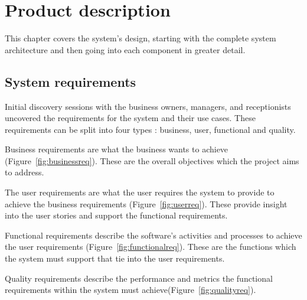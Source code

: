 \chapter{Product description} %
\label{Chapter4} %
This chapter covers the system's design, starting with the complete system architecture and then going into each component in greater detail.



\section{System requirements}
Initial discovery sessions with the business owners, managers, and receptionists uncovered the requirements for the system and their use cases. These requirements can be split into four types \parencite{cox_business_2021}: business, user, functional and quality.

Business requirements are what the business wants to achieve (Figure~\ref{fig:businessreq}). These are the overall objectives which the project aims to address.

The user requirements are what the user requires the system to provide to achieve the business requirements (Figure~\ref{fig:userreq}). These provide insight into the user stories and support the functional requirements.

Functional requirements describe the software's activities and processes to achieve the user requirements (Figure~\ref{fig:functionalreq}). These are the functions which the system must support that tie into the user requirements.

Quality requirements describe the performance and metrics the functional requirements within the system must achieve(Figure~\ref{fig:qualityreq}).

